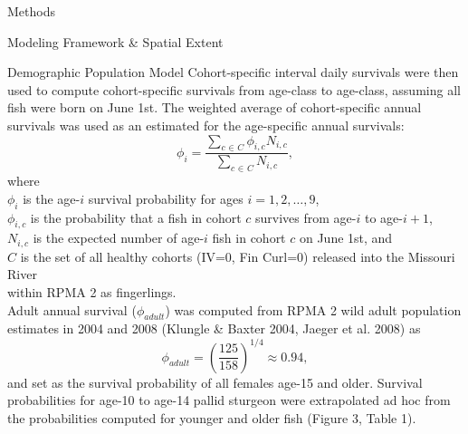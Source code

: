 \documentclass[12pt]{article}
\begin{document}
\begin{section}{Methods}
\begin{subsection}{Modeling Framework \& Spatial Extent}
\begin{subsubsection}{Demographic Population Model}
Cohort-specific interval daily survivals were then used to compute cohort-specific survivals from age-class to age-class, assuming all fish were born on June 1st.  The weighted average of cohort-specific annual survivals was used as an estimated for the age-specific annual survivals:
\begin{equation}
\phi_i=\frac{\displaystyle\sum_{c \hspace{1pt} \in \hspace{1pt} C} \phi_{i,c}N_{i,c}}{\displaystyle\sum_{c \hspace{1pt} \in \hspace{1pt} C} N_{i,c}},
\end{equation} 
where\\
\hspace*{0.5cm}$\phi_i$ is the age-$i$ survival probability for ages $i=1, 2, \ldots, 9$,\\
\hspace*{0.5cm}$\phi_{i,c}$ is the probability that a fish in cohort $c$ survives from age-$i$ to age-$i+1$,\\ 
\hspace*{0.5cm}$N_{i,c}$ is the expected number of age-$i$ fish in cohort $c$ on June 1st, and\\
\hspace*{0.5cm}$C$ is the set of all healthy cohorts (IV=0, Fin Curl=0) released into the Missouri River\\ 
\hspace*{1.5cm}within RPMA 2 as fingerlings.\\

Adult annual survival ($\phi_{adult}$) was computed from RPMA 2 wild adult population estimates in 2004 and 2008 (Klungle \& Baxter 2004, Jaeger et al. 2008) as
\begin{equation}
\phi_{adult}=\left(\frac{125}{158}\right)^{1/4}\approx 0.94,
\end{equation}
and set as the survival probability of all females age-15 and older.  Survival probabilities for age-10 to age-14 pallid sturgeon were extrapolated ad hoc from the probabilities computed for younger and older fish (Figure 3, Table 1).\\

  




\end{subsubsection}
\end{subsection}
\end{section}
\end{document}
